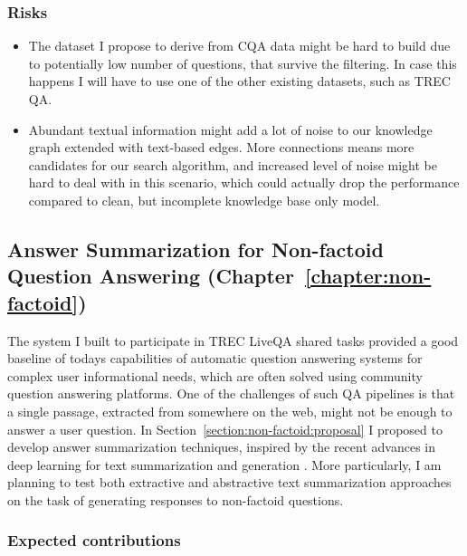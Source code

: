 \subsubsection{Risks}
\label{section:proposal:plan:factoid:risks}

\begin{itemize}
\item The dataset I propose to derive from CQA data might be hard to build due to potentially low number of questions, that survive the filtering. In case this happens I will have to use one of the other existing datasets, such as TREC QA.
\item Abundant textual information might add a lot of noise to our knowledge graph extended with text-based edges. More connections means more candidates for our search algorithm, and increased level of noise might be hard to deal with in this scenario, which could actually drop the performance compared to clean, but incomplete knowledge base only model.
\end{itemize}


\subsection{Answer Summarization for Non-factoid Question Answering (Chapter~\ref{chapter:non-factoid})}
\label{section:proposal:plan:non-factoid}

The system I built to participate in TREC LiveQA shared tasks provided a good baseline of todays capabilities of automatic question answering systems for complex user informational needs, which are often solved using community question answering platforms.
One of the challenges of such QA pipelines is that a single passage, extracted from somewhere on the web, might not be enough to answer a user question.
In Section~\ref{section:non-factoid:proposal} I proposed to develop answer summarization techniques, inspired by the recent advances in deep learning for text summarization \cite{rush-chopra-weston:2015:EMNLP,chopraabstractive16} and generation \cite{karpathy2015deep}.
More particularly, I am planning to test both extractive and abstractive text summarization approaches on the task of generating responses to non-factoid questions.

\subsubsection{Expected contributions}
\label{section:proposal:plan:non-factoid:contributions}

